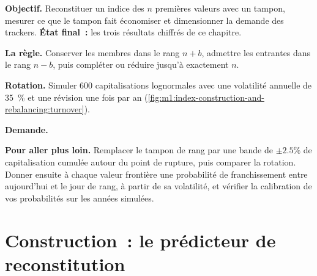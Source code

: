 \begin{tutorial}
\textbf{Objectif.} Reconstituer un indice des $n$ premières valeurs avec un tampon, mesurer ce que le
tampon fait économiser et dimensionner la demande des trackers. \textbf{État final~:} les trois
résultats chiffrés de ce chapitre.
\begin{tutsteps}
\item \textbf{La règle.} Conserver les membres dans le rang $n+b$, admettre les entrantes dans le rang
$n-b$, puis compléter ou réduire jusqu'à exactement $n$.
\label{lst:m1:index-construction-and-rebalancing:recon}
\item \textbf{Rotation.} Simuler 600 capitalisations lognormales avec une volatilité annuelle de 35~\%
et une révision une fois par an
(\cref{fig:m1:index-construction-and-rebalancing:turnover}).
\item \textbf{Demande.}
\label{lst:m1:index-construction-and-rebalancing:demand}
\end{tutsteps}
\textbf{Pour aller plus loin.} Remplacer le tampon de rang par une bande de $\pm
2.5\%$ de capitalisation cumulée autour du point de rupture, puis comparer la
rotation. Donner ensuite à chaque valeur frontière une probabilité de franchissement entre
aujourd'hui et le jour de rang, à partir de sa volatilité, et vérifier la calibration de
vos probabilités sur les années simulées.
\end{tutorial}

\section{Construction~: le prédicteur de reconstitution}\label{bld:m1:index-construction-and-rebalancing:predictor}

